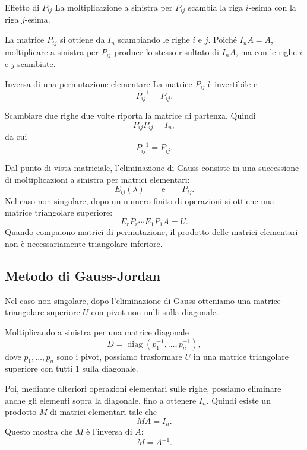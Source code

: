 \documentclass[a4paper]{article}
\begin{document}
\begin{snippetproposition}{Effetto di \(P_{ij}\)}
    La moltiplicazione a sinistra per \(P_{ij}\) scambia la riga \(i\)-esima con la riga \(j\)-esima.
\end{snippetproposition}

\begin{snippetproof}{}
    La matrice \(P_{ij}\) si ottiene da \(I_n\) scambiando le righe \(i\) e \(j\). Poiché \(I_nA=A\), moltiplicare a sinistra per \(P_{ij}\) produce lo stesso risultato di \(I_nA\), ma con le righe \(i\) e \(j\) scambiate.
\end{snippetproof}

\begin{snippetproposition}{Inversa di una permutazione elementare}
    La matrice \(P_{ij}\) è invertibile e
    \[
        P_{ij}^{-1}=P_{ij}.
    \]
\end{snippetproposition}

\begin{snippetproof}{}
    Scambiare due righe due volte riporta la matrice di partenza. Quindi
    \[
        P_{ij}P_{ij}=I_n,
    \]
    da cui
    \[
        P_{ij}^{-1}=P_{ij}.
    \]
\end{snippetproof}

Dal punto di vista matriciale, l'eliminazione di Gauss consiste in una successione di moltiplicazioni a sinistra per matrici elementari:
\[
    E_{ij}(\lambda)
    \qquad
    \text{e}
    \qquad
    P_{ij}.
\]
Nel caso non singolare, dopo un numero finito di operazioni si ottiene una matrice triangolare superiore:
\[
    E_rP_r\cdots E_1P_1A=U.
\]
Quando compaiono matrici di permutazione, il prodotto delle matrici elementari non è necessariamente triangolare inferiore.

\subsection{Metodo di Gauss-Jordan}

Nel caso non singolare, dopo l'eliminazione di Gauss otteniamo una matrice triangolare superiore \(U\) con pivot non nulli sulla diagonale.

Moltiplicando a sinistra per una matrice diagonale
\[
    D=
    \operatorname{diag}(p_1^{-1},\ldots,p_n^{-1}),
\]
dove \(p_1,\ldots,p_n\) sono i pivot, possiamo trasformare \(U\) in una matrice triangolare superiore con tutti \(1\) sulla diagonale.

Poi, mediante ulteriori operazioni elementari sulle righe, possiamo eliminare anche gli elementi sopra la diagonale, fino a ottenere \(I_n\). Quindi esiste un prodotto \(M\) di matrici elementari tale che
\[
    MA=I_n.
\]
Questo mostra che \(M\) è l'inversa di \(A\):
\[
    M=A^{-1}.
\]
\end{document}
